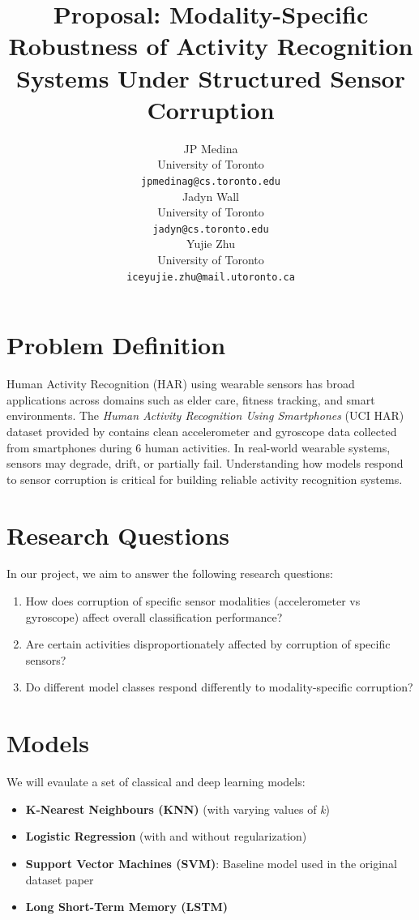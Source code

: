 \documentclass{article}
\title{Proposal: Modality-Specific Robustness of Activity Recognition Systems Under Structured Sensor Corruption}
\author{%
JP Medina \\
University of Toronto \\
\texttt{jpmedinag@cs.toronto.edu} \\
\And
Jadyn Wall \\
University of Toronto \\
\texttt{jadyn@cs.toronto.edu} \\
\And
Yujie Zhu \\
University of Toronto \\
\texttt{iceyujie.zhu@mail.utoronto.ca} \\
}
\begin{document}
\maketitle

\section{Problem Definition}
Human Activity Recognition (HAR) using wearable sensors has broad applications across domains
such as elder care, fitness tracking, and smart environments.
The \textit{Human Activity Recognition Using
Smartphones} (UCI HAR) dataset provided by \cite{reyes-ortiz-2013} contains clean 
accelerometer and gyroscope data collected from smartphones during 6 human activities.
In real-world wearable systems, sensors may degrade, drift, or partially fail. Understanding
how models respond to sensor corruption is critical for building reliable activity recognition
systems.

\section{Research Questions}
In our project, we aim to answer the following research questions:
\begin{enumerate}
    \item How does corruption of specific sensor modalities (accelerometer vs gyroscope) affect overall classification performance?
    \item Are certain activities disproportionately affected by corruption of specific sensors?
    \item Do different model classes respond differently to modality-specific corruption?
\end{enumerate}


\section{Models}
We will evaulate a set of classical and deep learning models: 
\begin{itemize}
    \item \textbf{K-Nearest Neighbours (KNN)} (with varying values of \textit{k})
    \item \textbf{Logistic Regression} (with and without regularization)
    \item \textbf{Support Vector Machines (SVM)}: Baseline model used in the original dataset paper
    \item \textbf{Long Short-Term Memory (LSTM)}
\end{itemize}
\end{document}
